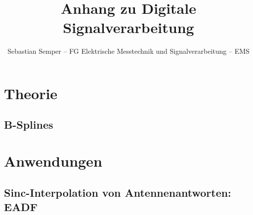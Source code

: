 \documentclass[ngerman]{article}
\title{Anhang zu Digitale Signalverarbeitung}
\author{Sebastian Semper -- FG Elektrische Messtechnik und Signalverarbeitung -- EMS}
\begin{document}


\section{Theorie}
\subsection{B-Splines}
\section{Anwendungen}
\subsection{Sinc-Interpolation von Antennenantworten: EADF}

%
%
%

\end{document}
